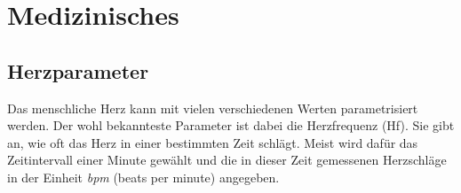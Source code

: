 
\chapter{Medizinisches}

\section{Herzparameter}
Das menschliche Herz kann mit vielen verschiedenen Werten parametrisiert werden. Der wohl bekannteste Parameter ist dabei die Herzfrequenz (Hf). Sie gibt an, wie oft das Herz in einer bestimmten Zeit schlägt. Meist wird dafür das Zeitintervall einer Minute gewählt und die in dieser Zeit gemessenen Herzschläge in der Einheit \emph{bpm} (beats per minute) angegeben. 

